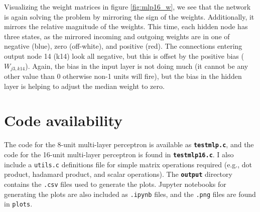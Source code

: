\documentclass[12pt]{article}
\begin{document}
Visualizing the weight matrices in figure \ref{fig:mlp16_w}, we see that the network is again solving the problem by mirroring the sign of the weights. Additionally, it mirrors the relative magnitude of the weights. This time, each hidden node has three states, as the mirrored incoming and outgoing weights are in one of negative (blue), zero (off-white), and positive (red). The connections entering output node 14 (k14) look all negative, but this is offset by the positive bias ($W_{j3,k14}$). Again, the bias in the input layer is not doing much (it cannot be any other value than 0 otherwise non-1 units will fire), but the bias in the hidden layer is helping to adjust the median weight to zero.

\section{Code availability}
The code for the 8-unit multi-layer perceptron is available as \textbf{\texttt{testmlp.c}}, and the code for the 16-unit multi-layer perceptron is found in \textbf{\texttt{testmlp16.c}}. I also include a \texttt{utils.c} definitions file for simple matrix operations required (e.g., dot product, hadamard product, and scalar operations). The \textbf{\texttt{output}} directory contains the \texttt{.csv} files used to generate the plots. Jupyter notebooks for generating the plots are also included as \texttt{.ipynb} files, and the \texttt{.png} files are found in \texttt{plots}.
\end{document}
